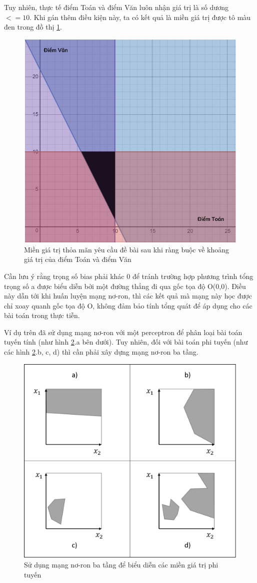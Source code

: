 \begin{answ}
Tuy nhiên, thực tế điểm Toán và điểm Văn luôn nhận giá trị là số dương \(<= 10\). Khi gán thêm điều kiện này, ta có kết quả là miền giá trị được tô màu đen trong đồ thị \ref{fig:example3-miengiatri2}.

\begin{figure}[h!]
	\centering
		\includegraphics[width=0.55\columnwidth]{books/artificial-neural-network/chapter01/figure/example 3 - graph 2.PNG}
        \caption{Miền giá trị thỏa mãn yêu cầu đề bài sau khi ràng buộc về khoảng giá trị của điểm Toán và điểm Văn}
        \label{fig:example3-miengiatri2}
		\centering
\end{figure}

Cần lưu ý rằng trọng số bias phải khác 0 để tránh trường hợp phương trình tổng trọng số a được biểu diễn bởi một đường thẳng đi qua gốc tọa độ O(0,0). Điều này dẫn tới khi huấn luyện mạng nơ-ron, thì các kết quả mà mạng này học được chỉ xoay quanh gốc tọa độ O, không đảm bảo tính tổng quát để áp dụng cho các bài toán trong thực tiễn.
\end{answ}
Ví dụ trên đã sử dụng mạng nơ-ron với một perceptron để phân loại bài toán tuyến tính (như hình \ref{fig:neuronRegion}.a bên dưới). Tuy nhiên, đối với bài toán phi tuyến (như các hình \ref{fig:neuronRegion}.b, c, d) thì cần phải xây dựng mạng nơ-ron ba tầng.

\begin{figure}[!h]
	\centering
		\includegraphics[width=0.6\columnwidth]{books/artificial-neural-network/chapter01/figure/Picture4.png}
    	\caption{Sử dụng mạng nơ-ron ba tầng để biểu diễn các miền giá trị phi tuyến}
	\centering
	\label{fig:neuronRegion}
\end{figure}

